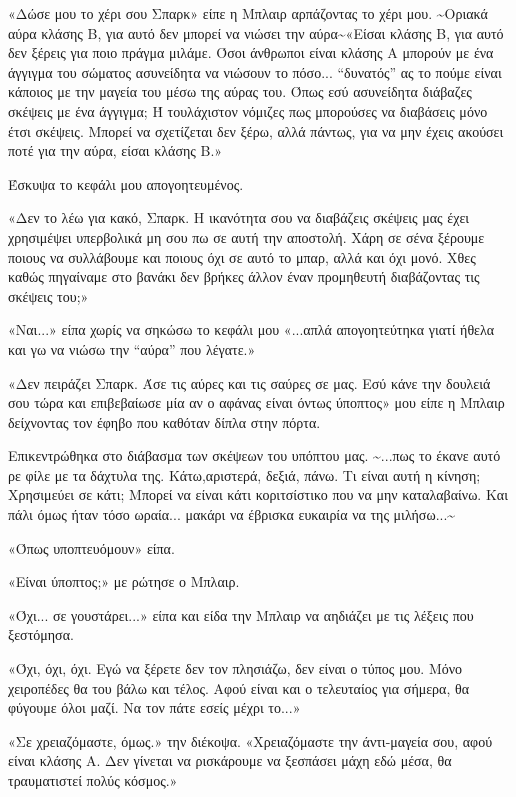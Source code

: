 \documentclass[12pt,twoside, openany]{book}
\begin{document}
«Δώσε μου το χέρι σου Σπαρκ» είπε η Μπλαιρ αρπάζοντας το χέρι μου. \textasciitilde Οριακά αύρα κλάσης Β, για αυτό δεν μπορεί να νιώσει την αύρα\textasciitilde  «Είσαι κλάσης Β, για αυτό δεν ξέρεις για ποιο πράγμα μιλάμε. Όσοι άνθρωποι είναι κλάσης Α μπορούν με ένα άγγιγμα του σώματος ασυνείδητα να νιώσουν το πόσο... “δυνατός” ας το πούμε είναι κάποιος με την μαγεία του μέσω της αύρας του. Όπως εσύ ασυνείδητα διάβαζες σκέψεις με ένα άγγιγμα; Ή τουλάχιστον νόμιζες πως μπορούσες να διαβάσεις μόνο έτσι σκέψεις. Μπορεί να σχετίζεται δεν ξέρω, αλλά πάντως, για να μην έχεις ακούσει ποτέ για την αύρα, είσαι κλάσης Β.»

Έσκυψα το κεφάλι μου απογοητευμένος.

«Δεν το λέω για κακό, Σπαρκ. Η ικανότητα σου να διαβάζεις σκέψεις μας έχει χρησιμέψει υπερβολικά μη σου πω σε αυτή την αποστολή. Χάρη σε σένα ξέρουμε ποιους να συλλάβουμε και ποιους όχι σε αυτό το μπαρ, αλλά και όχι μονό. Χθες καθώς πηγαίναμε στο βανάκι δεν βρήκες άλλον έναν προμηθευτή διαβάζοντας τις σκέψεις του;»

«Ναι...» είπα χωρίς να σηκώσω το κεφάλι μου «...απλά απογοητεύτηκα γιατί ήθελα και γω να νιώσω την “αύρα” που λέγατε.»

«Δεν πειράζει Σπαρκ. Άσε τις αύρες και τις σαύρες σε μας. Εσύ κάνε την δουλειά σου τώρα και επιβεβαίωσε μία αν ο αφάνας είναι όντως ύποπτος» μου είπε η Μπλαιρ δείχνοντας τον έφηβο που καθόταν δίπλα στην πόρτα.

Επικεντρώθηκα στο διάβασμα των σκέψεων του υπόπτου μας. \textasciitilde ...πως το έκανε αυτό ρε φίλε με τα δάχτυλα της. Κάτω,αριστερά, δεξιά, πάνω. Τι είναι αυτή η κίνηση; Χρησιμεύει σε κάτι; Μπορεί να είναι κάτι κοριτσίστικο που να μην καταλαβαίνω. Και πάλι όμως ήταν τόσο ωραία... μακάρι να έβρισκα ευκαιρία να της μιλήσω...\textasciitilde

«Όπως υποπτευόμουν» είπα.

«Είναι ύποπτος;» με ρώτησε ο Μπλαιρ.

«Όχι... σε γουστάρει...» είπα και είδα την Μπλαιρ να αηδιάζει με τις λέξεις που ξεστόμησα.

«Όχι, όχι, όχι. Εγώ να ξέρετε δεν τον πλησιάζω, δεν είναι ο τύπος μου. Μόνο χειροπέδες θα του βάλω και τέλος. Αφού είναι και ο τελευταίος για σήμερα, θα φύγουμε όλοι μαζί. Να τον πάτε εσείς μέχρι το...»

«Σε χρειαζόμαστε, όμως.» την διέκοψα. «Χρειαζόμαστε την άντι-μαγεία σου, αφού είναι κλάσης Α. Δεν γίνεται να ρισκάρουμε να ξεσπάσει μάχη εδώ μέσα, θα τραυματιστεί πολύς κόσμος.»
\end{document}
